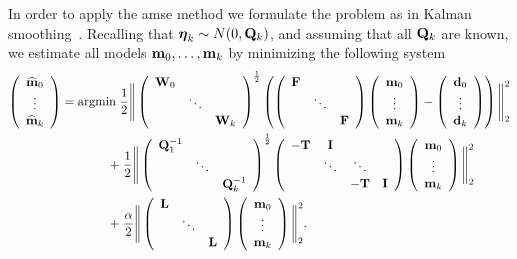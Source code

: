 \documentclass[final,leqno,onefignum,onetabnum]{siamltexmm}
\begin{document}
In order to apply the amse method we formulate the problem as in Kalman smoothing~\cite{kalman1960,Aravkin2013}. Recalling that  ${\boldsymbol \eta}_k \sim N(0,{\bf{Q}}_k)$, and assuming that all ${\bf{Q}}_k$ are known, we estimate all models ${\bf{m}}_0, \hdots, {\bf{m}}_k$ by minimizing the following system 
%
\begin{align}
\left(\begin{array}{c}  {\widehat{{\bf{m}}}}_0  \\ \vdots \\ {\widehat{{\bf{m}}}}_k\end{array}\right)
={\rm argmin }\;
& \frac12 \Bigg\|
\left(\begin{array}{ccc}{\bf{W}}_0 & &  \\ & \ddots &  \\  &  & {\bf{W}}_k \end{array}\right)^{\frac12}	
\left(
\left(\begin{array}{ccc}{\bf{F}} & &  \\    & \ddots & \\ & & {\bf{F}} \end{array}\right)	
\left(\begin{array}{c}  {\bf{m}}_0  \\ \vdots \\ {\bf{m}}_k\end{array}\right) -
\left(\begin{array}{c} {\bf{d}}_0   \\ \vdots \\ {\bf{d}}_k\end{array}\right)
\right)\Bigg\|^2_2\\
\nonumber
 + 
& \;\frac12 \Bigg\|
\left(\begin{array}{ccc}{\bf{Q}}^{-1}_1 &  \\ & \ddots  \\ & &{\bf{Q}}^{-1}_k \end{array}\right)^{\frac12}
\left( \begin{array}{cccc} -{\bf{T}} & {\bf{I}} &   \\  & \ddots & \ddots\\ & &   -{\bf{T}} & {\bf{I}}  \end{array}\right)
\left(\begin{array}{c}  {\bf{m}}_0  \\ \vdots \\ {\bf{m}}_k \end{array}\right)\Bigg\|^2_2\\
 + & \;{\frac \alpha 2}\Bigg\|
\left(\begin{array}{ccc}{\bf{L}} &  \\ & \ddots  \\ & &{\bf{L}}\end{array}\right)
\left(\begin{array}{c}  {\bf{m}}_0  \\ \vdots \\ {\bf{m}}_k \end{array}\right)\Bigg\|^2_2. 
\end{align}
%
\end{document}
